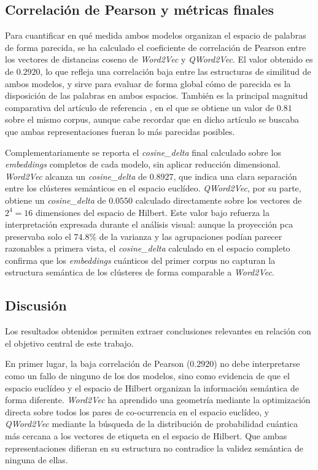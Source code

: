 \subsection{Correlación de Pearson y métricas finales}

Para cuantificar en qué medida ambos modelos organizan el espacio de palabras de forma parecida, se ha calculado el coeficiente de correlación de Pearson entre los vectores de distancias coseno de \textit{Word2Vec} y \textit{QWord2Vec}. El valor obtenido es de $0.2920$, lo que refleja una correlación baja entre las estructuras de similitud de ambos modelos, y sirve para evaluar de forma global cómo de parecida es la disposición de las palabras en ambos espacios. También es la principal magnitud comparativa del artículo de referencia \cite{ohno_qword2vec_2025}, en el que se obtiene un valor de $0.81$ sobre el mismo corpus, aunque cabe recordar que en dicho artículo se buscaba que ambas representaciones fueran lo más parecidas posibles.

Complementariamente se reporta el \textit{cosine\_delta} final calculado sobre los \textit{embeddings} completos de cada modelo, sin aplicar reducción dimensional. \textit{Word2Vec} alcanza un \textit{cosine\_delta} de $0.8927$, que indica una clara separación entre los clústeres semánticos en el espacio euclídeo. \textit{QWord2Vec}, por su parte, obtiene un \textit{cosine\_delta} de $0.0550$ calculado directamente sobre los vectores de $2^4 = 16$ dimensiones del espacio de Hilbert. Este valor bajo refuerza la interpretación expresada durante el análisis visual: aunque la proyección \gls{pca} preservaba solo el $74.8\%$ de la varianza y las agrupaciones podían parecer razonables a primera vista, el \textit{cosine\_delta} calculado en el espacio completo confirma que los \textit{embeddings} cuánticos del primer corpus no capturan la estructura semántica de los clústeres de forma comparable a \textit{Word2Vec}.

\subsection{Discusión}

Los resultados obtenidos permiten extraer conclusiones relevantes en relación con el objetivo central de este trabajo.

En primer lugar, la baja correlación de Pearson ($0.2920$) no debe interpretarse como un fallo de ninguno de los dos modelos, sino como evidencia de que el espacio euclídeo y el espacio de Hilbert organizan la información semántica de forma diferente. \textit{Word2Vec} ha aprendido una geometría mediante la optimización directa sobre todos los pares de co-ocurrencia en el espacio euclídeo, y \textit{QWord2Vec} mediante la búsqueda de la distribución de probabilidad cuántica más cercana a los vectores de etiqueta en el espacio de Hilbert. Que ambas representaciones difieran en su estructura no contradice la validez semántica de ninguna de ellas.

